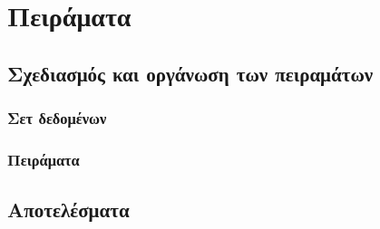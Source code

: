 

\chapter{Πειράματα}

\section{Σχεδιασμός και οργάνωση των πειραμάτων}
\subsection{Σετ δεδομένων}
\subsection{Πειράματα}
\section{Αποτελέσματα}